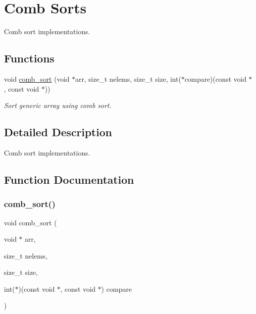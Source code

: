 \hypertarget{group__CombSort}{}\section{Comb Sorts}
\label{group__CombSort}


Comb sort implementations.  


\subsection*{Functions}
\begin{DoxyCompactItemize}
\item 
void \hyperlink{group__CombSort_ga98c1ffdc88b96dcb5f9a0d7d1e7a9622}{comb\+\_\+sort} (void $\ast$arr, size\+\_\+t nelems, size\+\_\+t size, int($\ast$compare)(const void $\ast$, const void $\ast$))
\begin{DoxyCompactList}\small\item\em Sort generic array using comb sort. \end{DoxyCompactList}\end{DoxyCompactItemize}


\subsection{Detailed Description}
Comb sort implementations. 



\subsection{Function Documentation}
\mbox{\label{group__CombSort_ga98c1ffdc88b96dcb5f9a0d7d1e7a9622}} 
\subsubsection{\texorpdfstring{comb\+\_\+sort()}{comb\_sort()}}
{\footnotesize\ttfamily void comb\+\_\+sort (\begin{DoxyParamCaption}\item[{void $\ast$}]{arr,  }\item[{size\+\_\+t}]{nelems,  }\item[{size\+\_\+t}]{size,  }\item[{int($\ast$)(const void $\ast$, const void $\ast$)}]{compare }\end{DoxyParamCaption})}



